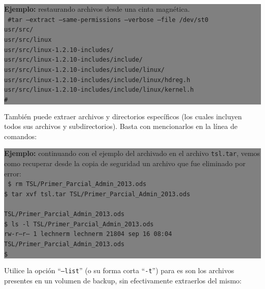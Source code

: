 \documentclass[12pt]{article}
\begin{document}
\colorbox{grey}{\parbox[t]{0.95\linewidth}{ \vspace*{0.5cm} { 
{\bf Ejemplo:} restaurando archivos desde una cinta magnética. \\
{\tt
\#tar --extract --same-permissions --verbose --file /dev/st0\\
usr/src/\\
usr/src/linux\\
usr/src/linux-1.2.10-includes/\\
usr/src/linux-1.2.10-includes/include/\\
usr/src/linux-1.2.10-includes/include/linux/\\
usr/src/linux-1.2.10-includes/include/linux/hdreg.h\\
usr/src/linux-1.2.10-includes/include/linux/kernel.h\\
\#\\
}
} \vspace*{0.5cm} } } 

También puede extraer archivos y directorios específicos (los cuales 
incluyen todos sus archivos y subdirectorios). Basta con mencionarlos en 
la línea de comandos:

\colorbox{grey}{\parbox[t]{0.95\linewidth}{ \vspace*{0.5cm} { 
{\bf Ejemplo:} continuando con el ejemplo del archivado en el archivo 
{\tt tsl.tar}, vemos como recuperar desde la copia de seguridad un archivo
que fue eliminado por error: \\
{\tt
\$ rm TSL/Primer\_Parcial\_Admin\_2013.ods \\
\$ tar xvf tsl.tar TSL/Primer\_Parcial\_Admin\_2013.ods \\
\\TSL/Primer\_Parcial\_Admin\_2013.ods\\
\$ ls -l TSL/Primer\_Parcial\_Admin\_2013.ods\\
\-rw-r--r-- 1 lechnerm lechnerm 21804 sep 16 08:04 TSL/Primer\_Parcial\_Admin\_2013.ods\\
\$ \\
}
} \vspace*{0.5cm} } } 

Utilice la opción ``{\tt --list}'' (o su forma corta ``{\tt -t}'') para 
es son los archivos presentes en un volumen de backup, sin efectivamente 
extraerlos del mismo:
\end{document}
